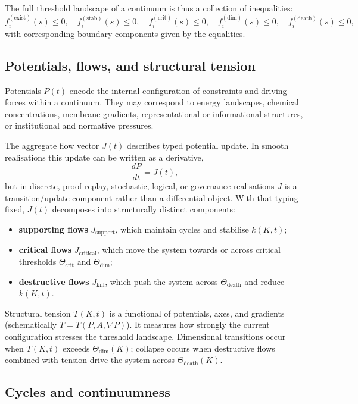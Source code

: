 The full threshold landscape of a continuum is thus a collection of inequalities:
\[
    f_{i}^{(\mathrm{exist})}(s) \le 0,\quad
    f_{i}^{(\mathrm{stab})}(s) \le 0,\quad
    f_{i}^{(\mathrm{crit})}(s) \le 0,\quad
    f_{i}^{(\mathrm{dim})}(s) \le 0,\quad
    f_{i}^{(\mathrm{death})}(s) \le 0,
\]
with corresponding boundary components given by the equalities.

\subsection{Potentials, flows, and structural tension}

Potentials \(P(t)\) encode the internal configuration of constraints and driving forces within a continuum.
They may correspond to energy landscapes, chemical concentrations, membrane gradients, representational or informational structures, or institutional and normative pressures.

The aggregate flow vector \(J(t)\) describes typed potential update. In smooth
realisations this update can be written as a derivative,
\[
    \frac{dP}{dt} = J(t),
\]
but in discrete, proof-replay, stochastic, logical, or governance realisations
\(J\) is a transition/update component rather than a differential object. With
that typing fixed, \(J(t)\) decomposes into structurally distinct components:
\begin{itemize}
    \item \textbf{supporting flows} \(J_{\mathrm{support}}\), which maintain cycles and stabilise \(k(K,t)\);
    \item \textbf{critical flows} \(J_{\mathrm{critical}}\), which move the system towards or across critical thresholds \(\Theta_{\mathrm{crit}}\) and \(\Theta_{\mathrm{dim}}\);
    \item \textbf{destructive flows} \(J_{\mathrm{kill}}\), which push the system across \(\Theta_{\mathrm{death}}\) and reduce \(k(K,t)\).
\end{itemize}

Structural tension \(T(K,t)\) is a functional of potentials, axes, and gradients (schematically \(T=T(P,A,\nabla P)\)).
It measures how strongly the current configuration stresses the threshold landscape.
Dimensional transitions occur when \(T(K,t)\) exceeds \(\Theta_{\mathrm{dim}}(K)\); collapse occurs when destructive flows combined with tension drive the system across \(\Theta_{\mathrm{death}}(K)\).

\subsection{Cycles and continuumness}

